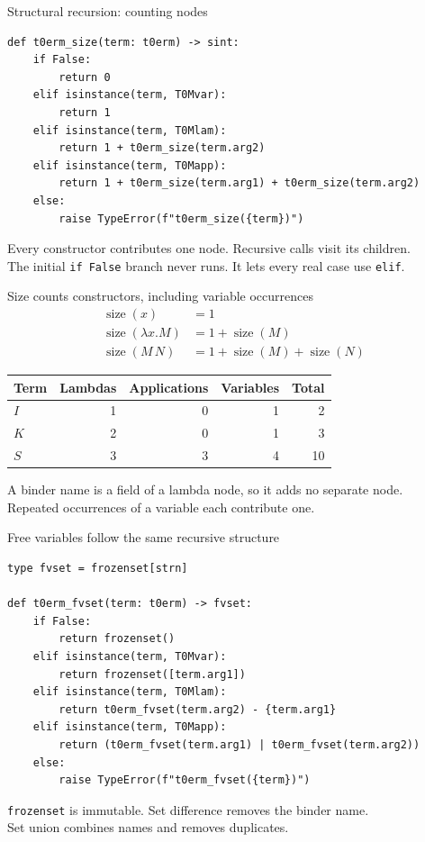 \documentclass[aspectratio=169,11pt]{beamer}
\newcommand{\sz}{\operatorname{size}}
\begin{document}
\begin{frame}[fragile]{Structural recursion: counting nodes}
\begin{lstlisting}
def t0erm_size(term: t0erm) -> sint:
    if False:
        return 0
    elif isinstance(term, T0Mvar):
        return 1
    elif isinstance(term, T0Mlam):
        return 1 + t0erm_size(term.arg2)
    elif isinstance(term, T0Mapp):
        return 1 + t0erm_size(term.arg1) + t0erm_size(term.arg2)
    else:
        raise TypeError(f"t0erm_size({term})")
\end{lstlisting}
Every constructor contributes one node. Recursive calls visit its children.\\[0.5em]
The initial \texttt{if False} branch never runs. It lets every real case use \texttt{elif}.
\end{frame}

\begin{frame}{Size counts constructors, including variable occurrences}
\begin{align*}
\sz(x) &= 1\\
\sz(\lambda x.M) &= 1 + \sz(M)\\
\sz(M\,N) &= 1 + \sz(M) + \sz(N)
\end{align*}
\begin{center}
\begin{tabular}{lrrrr}\toprule
Term & Lambdas & Applications & Variables & Total\\\midrule
$I$ & 1 & 0 & 1 & 2\\
$K$ & 2 & 0 & 1 & 3\\
$S$ & 3 & 3 & 4 & 10\\\bottomrule
\end{tabular}
\end{center}
\medskip
A binder name is a field of a lambda node, so it adds no separate node.\\
Repeated occurrences of a variable each contribute one.
\end{frame}

\begin{frame}[fragile]{Free variables follow the same recursive structure}
\begin{lstlisting}
type fvset = frozenset[strn]

def t0erm_fvset(term: t0erm) -> fvset:
    if False:
        return frozenset()
    elif isinstance(term, T0Mvar):
        return frozenset([term.arg1])
    elif isinstance(term, T0Mlam):
        return t0erm_fvset(term.arg2) - {term.arg1}
    elif isinstance(term, T0Mapp):
        return (t0erm_fvset(term.arg1) | t0erm_fvset(term.arg2))
    else:
        raise TypeError(f"t0erm_fvset({term})")
\end{lstlisting}
\texttt{frozenset} is immutable. Set difference removes the binder name.\\
Set union combines names and removes duplicates.
\end{frame}
\end{document}
